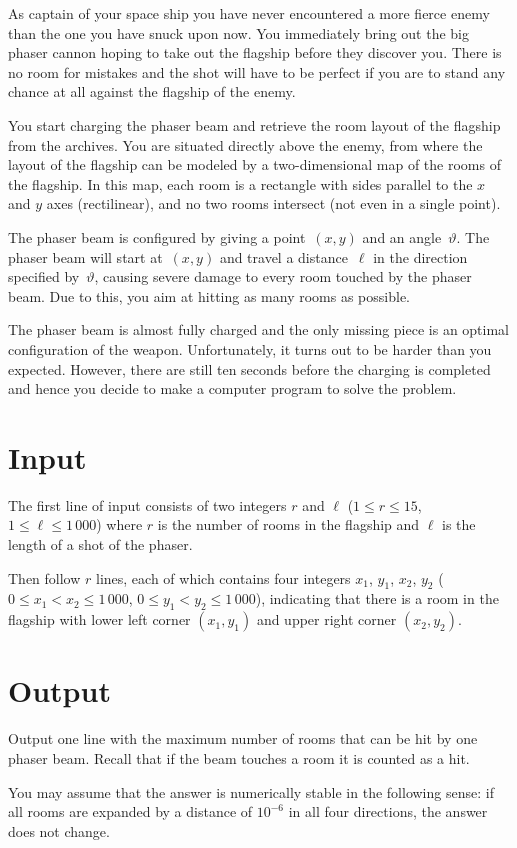 
%
\noindent
As captain of your space ship you have never encountered a more fierce enemy
than the one you have snuck upon now.
%
You immediately %
bring out the big phaser cannon hoping to take out the flagship before they discover
you.
There is no room for mistakes and the shot %
will have to be perfect if you are to stand any chance at all against the
flagship of the enemy.

You start charging the phaser beam and retrieve the room
layout of the flagship from the archives.
You are situated directly above the enemy, from where the layout of the flagship can be modeled by a two-dimensional map of the rooms of the flagship.  In this map, each room is a rectangle with sides parallel to the $x$ and $y$ axes (rectilinear), and no two
rooms intersect (not even in a single point).

The phaser beam is configured by giving a point~$(x, y)$ and an angle~$\vartheta$.  The
phaser beam will start at~$(x, y)$ and travel a distance~$\ell$ in the direction
specified by~$\vartheta$, causing severe damage to every room touched by the phaser
beam.  Due to this, you aim at hitting as many rooms as possible.

The phaser beam is almost fully charged and the only missing piece is an optimal
configuration of the weapon.  Unfortunately, it turns out to be harder than you
expected.  However, there are still ten seconds before the charging is
completed and hence you decide to make a computer program to solve the problem.

\section*{Input}
The first line of input consists of two integers $r$ and $\ell$ ($1 \le r \le 15$, $1 \le \ell \le 1\,000$) where $r$ is the number of rooms
in the flagship and $\ell$ is the length of a shot of the phaser.

%
Then follow $r$ lines, each of which contains four integers $x_1$, $y_1$, $x_2$, $y_2$ ($0 \le x_1 < x_2 \le 1\,000$, $0 \le y_1 < y_2 \le 1\,000$), indicating that there is a room in the flagship with lower left corner $(x_1, y_1)$ and upper
right corner $(x_2, y_2)$.


\section*{Output}

Output one line with the maximum number of rooms that can be hit by one phaser
beam.  Recall that if the beam touches a room it is counted as a hit.

You may assume that the answer is numerically stable in the following sense:
if all rooms are expanded by a distance of $10^{-6}$ in all four
directions, the answer does not change.
